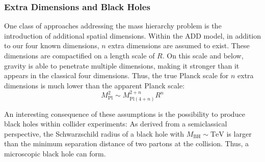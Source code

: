%


\subsubsection{Extra Dimensions and Black Holes}
One class of approaches addressing the mass hierarchy problem is the introduction of additional spatial dimensions. Within the \acf{ADD} model\cite{Arkani-Hamed:Hierarchyproblemnew}, in addition to our four known dimensions, $n$ extra dimensions are assumed to exist. These dimensions are compactified on a length scale of $R$. On this scale and below, gravity is able to penetrate multiple dimensions, making it stronger than it appears in the classical four dimensions. Thus, the true Planck scale for $n$ extra dimensions is much lower than the apparent Planck scale:
\begin{equation}
    M_\text{Pl}^2 \sim M_{\text{Pl}(4+n)}^{2+n} R^n
\end{equation}

An interesting consequence of these assumptions is the possibility to produce black holes within collider experiments\cite{Dimopoulos:BlackHolesLHCa}: As derived from a semiclassical perspective, the Schwarzschild radius of a black hole with $M_\text{BH} \sim \si{\TeV}$ is larger than the minimum separation distance of two partons at the collision. Thus, a microscopic black hole can form.

